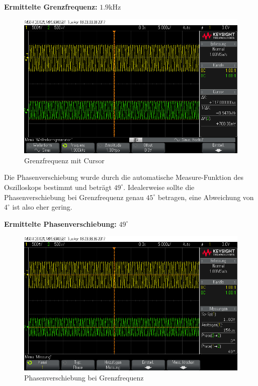 \documentclass[10pt]{report}
\begin{document}
      \vspace{0.5cm}

      \textbf{Ermittelte Grenzfrequenz:} $1.9$kHz


      \begin{figure}[H]
       \includegraphics[width=\textwidth]{scope_8.png}
       \caption{Grenzfrequenz mit Cursor}
     \end{figure}

     Die Phasenverschiebung wurde durch die automatische Measure-Funktion des
     Oszilloskops bestimmt und beträgt $49^\circ$. Idealerweise sollte die
     Phasenverschiebung bei Grenzfrequenz genau $45^\circ$ betragen, eine
     Abweichung von $4^\circ$ ist also eher gering.

     \vspace{0.5cm}

     \textbf{Ermittelte Phasenverschiebung:} $49^\circ$
     \begin{figure}[H]
      \includegraphics[width=\textwidth]{scope_9.png}
      \caption{Phasenverschiebung bei Grenzfrequenz}
    \end{figure}
\end{document}

